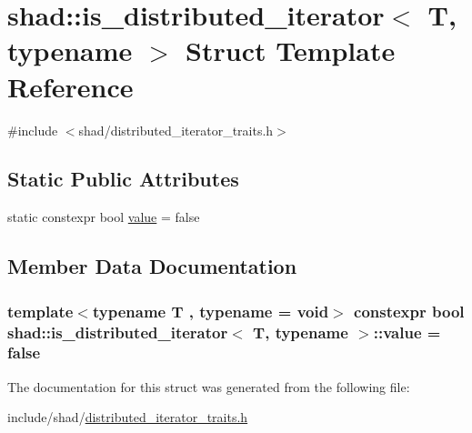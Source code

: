 \hypertarget{structshad_1_1is__distributed__iterator}{\section{shad\-:\-:is\-\_\-distributed\-\_\-iterator$<$ T, typename $>$ Struct Template Reference}
\label{structshad_1_1is__distributed__iterator}
}


{\ttfamily \#include $<$shad/distributed\-\_\-iterator\-\_\-traits.\-h$>$}

\subsection*{Static Public Attributes}
\begin{DoxyCompactItemize}
\item 
static constexpr bool \hyperlink{structshad_1_1is__distributed__iterator_a8eff7da7d0308d61ac32d008fe4a4219}{value} = false
\end{DoxyCompactItemize}


\subsection{Member Data Documentation}
\hypertarget{structshad_1_1is__distributed__iterator_a8eff7da7d0308d61ac32d008fe4a4219}{
\subsubsection[{value}]{\setlength{\rightskip}{0pt plus 5cm}template$<$typename T , typename  = void$>$ constexpr bool {\bf shad\-::is\-\_\-distributed\-\_\-iterator}$<$ T, typename $>$\-::value = false\hspace{0.3cm}{\ttfamily [static]}}}\label{structshad_1_1is__distributed__iterator_a8eff7da7d0308d61ac32d008fe4a4219}


The documentation for this struct was generated from the following file\-:\begin{DoxyCompactItemize}
\item 
include/shad/\hyperlink{distributed__iterator__traits_8h}{distributed\-\_\-iterator\-\_\-traits.\-h}\end{DoxyCompactItemize}
